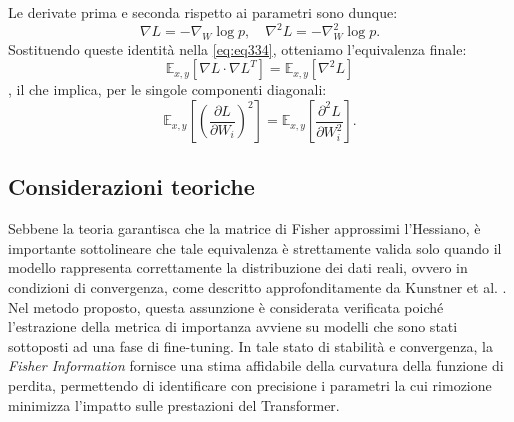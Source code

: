 Le derivate prima e seconda rispetto ai parametri sono dunque:
\begin{equation}\nabla L = -\nabla_W \log p, \quad \nabla^2 L = -\nabla_W^2 \log p.
\end{equation}
Sostituendo queste identità nella \eqref{eq:eq334}, otteniamo l'equivalenza finale:
\begin{equation}
    \mathbb{E}_{x,y} \left[ \nabla L \cdot \nabla L^T \right] = \mathbb{E}_{x,y} \left[ \nabla^2 L \right]\end{equation},
il che implica, per le singole componenti diagonali:
\begin{equation}
    \mathbb{E}_{x,y} \left[ \left( \frac{\partial L}{\partial W_i} \right)^2 \right] = \mathbb{E}_{x,y} \left[ \frac{\partial^2 L}{\partial W_i^2} \right].
\end{equation}
\subsection*{Considerazioni teoriche}
Sebbene la teoria garantisca che la matrice di Fisher approssimi l'Hessiano, è
importante sottolineare che tale equivalenza è strettamente valida solo quando
il modello rappresenta correttamente la distribuzione dei dati reali, ovvero in
condizioni di convergenza, come descritto approfonditamente da Kunstner et al.
\cite{kunstner2020limitationsempiricalfisherapproximation}. Nel metodo
proposto, questa assunzione è considerata verificata poiché l'estrazione della
metrica di importanza avviene su modelli che sono stati sottoposti ad una fase
di fine-tuning. In tale stato di stabilità e convergenza, la \textit{Fisher
    Information} fornisce una stima affidabile della curvatura della funzione di
perdita, permettendo di identificare con precisione i parametri la cui
rimozione minimizza l'impatto sulle prestazioni del Transformer.
